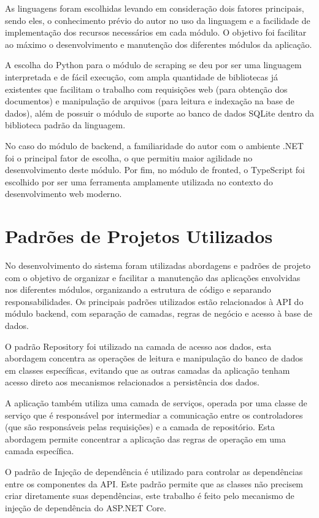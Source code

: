 As linguagens foram escolhidas levando em consideração dois fatores principais, sendo eles, o conhecimento prévio do autor no uso da linguagem e a facilidade de implementação dos recursos necessários em cada módulo. O objetivo foi facilitar ao máximo o desenvolvimento e manutenção dos diferentes módulos da aplicação.

A escolha do Python para o módulo de scraping se deu por ser uma linguagem interpretada e de fácil execução, com ampla quantidade de bibliotecas já existentes que facilitam o trabalho com requisições web (para obtenção dos documentos) e manipulação de arquivos (para leitura e indexação na base de dados), além de possuir o módulo de suporte ao banco de dados SQLite dentro da biblioteca padrão da linguagem.

No caso do módulo de backend, a familiaridade do autor com o ambiente .NET foi o principal fator de escolha, o que permitiu maior agilidade no desenvolvimento deste módulo. Por fim, no módulo de fronted, o TypeScript foi escolhido por ser uma ferramenta amplamente utilizada no contexto do desenvolvimento web moderno.

\section{Padrões de Projetos Utilizados}

No desenvolvimento do sistema foram utilizadas abordagens e padrões de projeto com o objetivo de organizar e facilitar a manutenção das aplicações envolvidas nos diferentes módulos, organizando a estrutura de código e separando responsabilidades. Os principais padrões utilizados estão relacionados à API do módulo backend, com separação de camadas, regras de negócio e acesso à base de dados.

O padrão Repository foi utilizado na camada de acesso aos dados, esta abordagem concentra as operações de leitura e manipulação do banco de dados em classes específicas, evitando que as outras camadas da aplicação tenham acesso direto aos mecanismos relacionados a persistência dos dados.

A aplicação também utiliza uma camada de serviços, operada por uma classe de serviço que é responsável por intermediar a comunicação entre os controladores (que são responsáveis pelas requisições) e a camada de repositório. Esta abordagem permite concentrar a aplicação das regras de operação em uma camada específica.

O padrão de Injeção de dependência é utilizado para controlar as dependências entre os componentes da API. Este padrão permite que as classes não precisem criar diretamente suas dependências, este trabalho é feito pelo mecanismo de injeção de dependência do ASP.NET Core.

